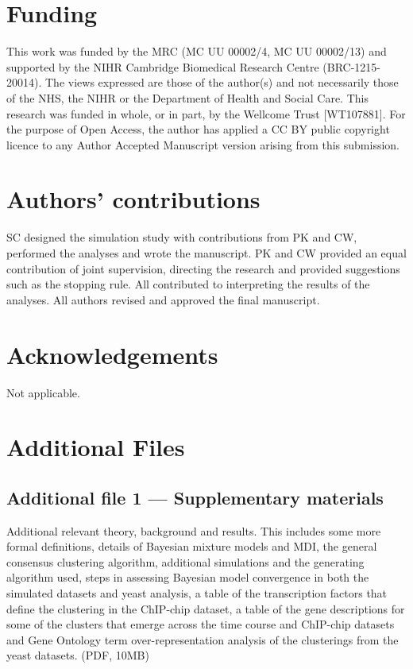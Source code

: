 \documentclass{bmcart}
\begin{document}
\begin{backmatter}
		\section*{Funding}%
		This work was funded by the MRC (MC UU 00002/4, MC UU 00002/13) and supported by the NIHR Cambridge Biomedical Research Centre (BRC-1215-20014). The views expressed are those of the author(s) and not necessarily those of the NHS, the NIHR or the Department of Health and Social Care. This research was funded in whole, or in part, by the Wellcome Trust [WT107881]. For the purpose of Open Access, the author has applied a CC BY public copyright licence to any Author Accepted Manuscript version arising from this submission.
		
		
		\section*{Authors' contributions}
		SC designed the simulation study with contributions from PK and CW, performed the analyses and wrote the manuscript. PK and CW provided an equal contribution of joint supervision, directing the research and provided suggestions such as the stopping rule. All contributed to interpreting the results of the analyses. All authors revised and approved the final manuscript.
		
		\section*{Acknowledgements}%
		Not applicable.
		
		\vspace*{-12pt}
		
		
		  
		
		\section*{Additional Files}
		\subsection*{Additional file 1 --- Supplementary materials}
		Additional relevant theory, background and results. This includes some more formal definitions, details of Bayesian mixture models and MDI, the general consensus clustering algorithm, additional simulations and the generating algorithm used, steps in assessing Bayesian model convergence in both the simulated datasets and yeast analysis, a table of the transcription factors that define the clustering in the ChIP-chip dataset, a table of the gene descriptions for some of the clusters that emerge across the time course and ChIP-chip datasets and Gene Ontology term over-representation analysis of the clusterings from the yeast datasets. (PDF, 10MB)
		
	\end{backmatter}
\end{document}
